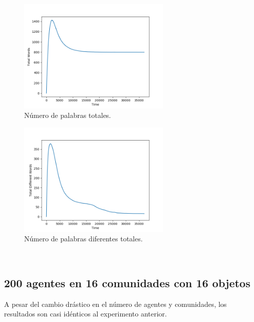 \documentclass[runningheads]{llncs}
\begin{document}
\begin{figure}[H]
	\centering
	\includegraphics[width=0.65\textwidth]{Figure_311_TotalWords.png}
	\caption{Número de palabras totales.}
	\label{fig_004}
\end{figure}
\begin{figure}[H]
	\centering
	\includegraphics[width=0.65\textwidth]{Figure_311_TotalDifferentWords.png}
	\caption{Número de palabras diferentes totales.}
	\label{fig_005}
\end{figure}
\pagebreak
\\
\subsection{200 agentes en 16 comunidades con 16 objetos}

A pesar del cambio drástico en el número de agentes y comunidades, los resultados son casi idénticos al experimento anterior. 
\end{document}
